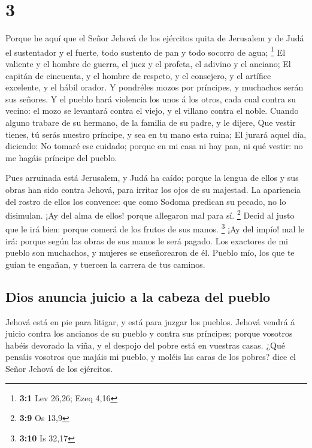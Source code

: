 \hypertarget{section-2}{%
\section{3}\label{section-2}}

 Porque he aquí que el Señor Jehová de los ejércitos quita
de Jerusalem y de Judá el sustentador y el fuerte, todo sustento de pan
y todo socorro de agua; \footnote{\textbf{3:1} Lev 26,26; Ezeq 4,16}
 El valiente y el hombre de guerra, el juez y el profeta, el
adivino y el anciano;  El capitán de cincuenta, y el hombre
de respeto, y el consejero, y el artífice excelente, y el hábil orador.
 Y pondréles mozos por príncipes, y muchachos serán sus
señores.  Y el pueblo hará violencia los unos á los otros,
cada cual contra su vecino: el mozo se levantará contra el viejo, y el
villano contra el noble.  Cuando alguno trabare de su
hermano, de la familia de su padre, y le dijere, Que vestir tienes, tú
serás nuestro príncipe, y sea en tu mano esta ruina;  El
jurará aquel día, diciendo: No tomaré ese cuidado; porque en mi casa ni
hay pan, ni qué vestir: no me hagáis príncipe del pueblo.

 Pues arruinada está Jerusalem, y Judá ha caído; porque la
lengua de ellos y sus obras han sido contra Jehová, para irritar los
ojos de su majestad.  La apariencia del rostro de ellos los
convence: que como Sodoma predican su pecado, no lo disimulan. ¡Ay del
alma de ellos! porque allegaron mal para sí. \footnote{\textbf{3:9} Os
  13,9}  Decid al justo que le irá bien: porque comerá de
los frutos de sus manos. \footnote{\textbf{3:10} Is 32,17} 
¡Ay del impío! mal le irá: porque según las obras de sus manos le será
pagado.  Los exactores de mi pueblo son muchachos, y
mujeres se enseñorearon de él. Pueblo mío, los que te guían te engañan,
y tuercen la carrera de tus caminos.

\hypertarget{dios-anuncia-juicio-a-la-cabeza-del-pueblo}{%
\subsection{Dios anuncia juicio a la cabeza del
pueblo}\label{dios-anuncia-juicio-a-la-cabeza-del-pueblo}}

 Jehová está en pie para litigar, y está para juzgar los
pueblos.  Jehová vendrá á juicio contra los ancianos de su
pueblo y contra sus príncipes; porque vosotros habéis devorado la viña,
y el despojo del pobre está en vuestras casas.  ¿Qué
pensáis vosotros que majáis mi pueblo, y moléis las caras de los pobres?
dice el Señor Jehová de los ejércitos.

